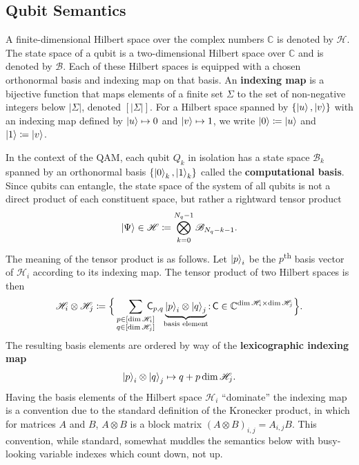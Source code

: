 \documentclass[conference]{IEEEtran}
\newcommand{\defn}[1]{\textbf{#1}}
\newcommand{\Hil}{\ensuremath{\mathscr{H}}}
\newcommand{\BHil}{\ensuremath{\mathscr{B}}}
\begin{document}
\subsection{Qubit Semantics}\label{sec:qubitsemantics}
A finite-dimensional Hilbert space over the complex numbers $\mathbb{C}$ is denoted by \Hil. The state space of a qubit is a two-dimensional Hilbert space over $\mathbb{C}$ and is denoted by \BHil. Each of these Hilbert spaces is equipped with a chosen orthonormal basis and indexing map on that basis. An \defn{indexing map} is a bijective function that maps elements of a finite set $\Sigma$ to the set of non-negative integers below $\vert\Sigma\vert$, denoted $[\vert\Sigma\vert]$. For a Hilbert space spanned by $\{\ket{u}, \ket{v}\}$ with an indexing map defined by $\ket{u}\mapsto 0$ and $\ket{v}\mapsto 1$, we write $\ket{0}\coloneqq\ket{u}$ and $\ket{1}\coloneqq\ket{v}$.

In the context of the QAM, each qubit $Q_k$ in isolation has a state space $\BHil_k$ spanned by an orthonormal basis $\{\ket{0}_k,\ket{1}_k\}$ called the \defn{computational basis}. Since qubits can entangle, the state space of the system of all qubits is not a direct product of each constituent space, but rather a rightward tensor product
\begin{equation}\label{eq:tensoredup}
\ket{\Psi} \in \Hil \coloneqq \bigotimes_{k=0}^{N_q-1} \BHil_{N_q - k - 1}.
\end{equation}
The meaning of the tensor product is as follows. Let $\ket{p}_i$ be the $p$\textsuperscript{th} basis vector of $\Hil_i$ according to its indexing map. The tensor product of two Hilbert spaces is then
\begin{equation}\label{eq:hilbertproduct}
\Hil_i \otimes \Hil_j \coloneqq \Big\{\sum_{\substack{p\in[\dim \Hil_i]\\q\in[\dim \Hil_j]}}\!\!\!\!\!\!\mathsf{C}_{p,q}\underbrace{\ket{p}_i\otimes\ket{q}_j}_{\mathclap{\text{basis element}}} \mathbin{:}\, \mathsf{C} \in \mathbb{C}^{\dim \Hil_i \times \dim \Hil_j}\Big\}.
\end{equation}
The resulting basis elements are ordered by way of the \defn{lexicographic indexing map}
\begin{equation}
\ket{p}_i\otimes\ket{q}_j \mapsto q + p\dim \Hil_j.
\end{equation}
Having the basis elements of the Hilbert space $\Hil_i$ ``dominate'' the indexing map is a convention due to the standard definition of the Kronecker product, in which for matrices $A$ and $B$, $A\otimes B$ is a block matrix $(A\otimes B)_{i,j} = A_{i,j} B$. This convention, while standard, somewhat muddles the semantics below with busy-looking variable indexes which count down, not up.
\end{document}
